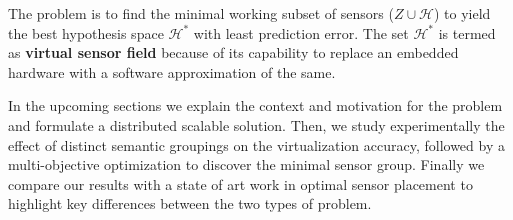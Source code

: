
The problem is to find the minimal working subset of sensors ($Z \cup \mathcal{H}$) to yield the best hypothesis space $\mathcal{H}^*$ with least prediction error.
The set $\mathcal{H}^*$ is termed as \textbf{virtual sensor field} because of its capability to replace an embedded hardware with a software approximation of the same.
 
In the upcoming sections we explain the context and motivation for the problem and formulate a distributed scalable solution.
Then, we study experimentally the effect of distinct semantic groupings on the virtualization accuracy, followed by a multi-objective optimization to discover the minimal sensor group. 
Finally we compare our results with a state of art work in optimal sensor placement to highlight key differences between the two types of problem. 

